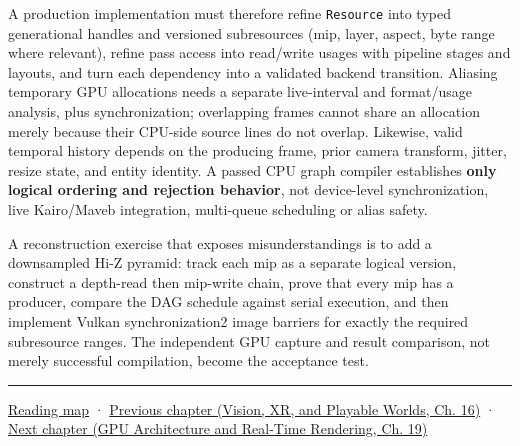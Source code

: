 A production implementation must therefore refine \texttt{Resource} into typed generational handles and versioned subresources (mip, layer, aspect, byte range where relevant), refine pass access into read/write usages with pipeline stages and layouts, and turn each dependency into a validated backend transition. Aliasing temporary GPU allocations needs a separate live-interval and format/usage analysis, plus synchronization; overlapping frames cannot share an allocation merely because their CPU-side source lines do not overlap. Likewise, valid temporal history depends on the producing frame, prior camera transform, jitter, resize state, and entity identity. A passed CPU graph compiler establishes \textbf{only logical ordering and rejection behavior}, not device-level synchronization, live Kairo/Maveb integration, multi-queue scheduling or alias safety.

A reconstruction exercise that exposes misunderstandings is to add a downsampled Hi-Z pyramid: track each mip as a separate logical version, construct a depth-read then mip-write chain, prove that every mip has a producer, compare the DAG schedule against serial execution, and then implement Vulkan synchronization2 image barriers for exactly the required subresource ranges. The independent GPU capture and result comparison, not merely successful compilation, become the acceptance test.

\begin{center}\rule{0.5\linewidth}{0.5pt}\end{center}

\hyperref[volume-reading-map]{Reading map} · \href{../07-Vision-XR-and-Playable-Worlds/main.pdf\#nameddest=06-engine-ii-ch041-evidence-tools-and-revisable-design}{Previous chapter (Vision, XR, and Playable Worlds, Ch. 16)} · \href{../06-GPU-Architecture-and-Real-Time-Rendering/main.pdf\#nameddest=06-engine-ii-ch043-compiling-renderer-intent-into-backend-work}{Next chapter (GPU Architecture and Real-Time Rendering, Ch. 19)}
